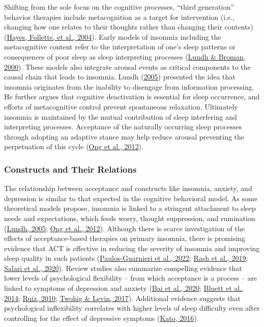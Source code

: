 \documentclass[
  ,doc,11pt, twoside,floatsintext]{apa6}
\begin{document}
Shifting from the sole focus on the cognitive processes, ``third generation'' behavior therapies include metacognition as a target for intervention (i.e., changing how one relates to their thoughts rather than changing their contents) (\protect\hyperlink{ref-hayes2004mindfulness}{Hayes, Follette, et al., 2004}). Early models of insomnia including the metacognitive content refer to the interpretation of one's sleep patterns or consequences of poor sleep as sleep interpreting processes (\protect\hyperlink{ref-lundh2000}{Lundh \& Broman, 2000}). These models also integrate arousal events as critical components to the causal chain that leads to insomnia. Lundh (\protect\hyperlink{ref-lundh2005}{2005}) presented the idea that insomnia originates from the inability to disengage from information processing. He further argues that cognitive deactivation is essential for sleep occurrence, and efforts of metacognitive control prevent spontaneous relaxation. Ultimately insomnia is maintained by the mutual contribution of sleep interfering and interpreting processes. Acceptance of the naturally occurring sleep processes through adopting an adaptive stance may help reduce arousal preventing the perpetuation of this cycle (\protect\hyperlink{ref-ong2012}{Ong et al., 2012}).

\hypertarget{constructs-and-their-relations-1}{%
\subsubsection{Constructs and Their Relations}\label{constructs-and-their-relations-1}}

The relationship between acceptance and constructs like insomnia, anxiety, and depression is similar to that expected in the cognitive behavioral model. As some theoretical models propose, insomnia is linked to a stringent attachment to sleep needs and expectations, which feeds worry, thought suppression, and rumination (\protect\hyperlink{ref-lundh2005}{Lundh, 2005}; \protect\hyperlink{ref-ong2012}{Ong et al., 2012}). Although there is scarce investigation of the effects of acceptance-based therapies on primary insomnia, there is promising evidence that ACT is effective in reducing the severity of insomnia and improving sleep quality in such patients (\protect\hyperlink{ref-paulos-guarnieri2022}{Paulos-Guarnieri et al., 2022}; \protect\hyperlink{ref-rash2019}{Rash et al., 2019}; \protect\hyperlink{ref-salari2020}{Salari et al., 2020}). Review studies also summarize compelling evidence that lower levels of psychological flexibility -- from which acceptance is a process -- are linked to symptoms of depression and anxiety (\protect\hyperlink{ref-bai2020}{Bai et al., 2020}; \protect\hyperlink{ref-bluett2014}{Bluett et al., 2014}; \protect\hyperlink{ref-ruiz2010}{Ruiz, 2010}; \protect\hyperlink{ref-twohig2017}{Twohig \& Levin, 2017}). Additional evidence suggests that psychological inflexibility correlates with higher levels of sleep difficulty even after controlling for the effect of depressive symptoms (\protect\hyperlink{ref-kato2016}{Kato, 2016}).
\end{document}
